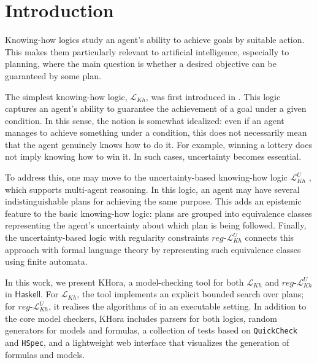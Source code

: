 \section{Introduction}

Knowing-how logics study an agent's ability to achieve goals by suitable action. This makes them particularly relevant to artificial intelligence, especially to planning, where the main question is whether a desired objective can be guaranteed by some plan.\par

The simplest knowing-how logic, $\mathcal{L}_{Kh}$, was first introduced in \cite{Wang2015}. This logic captures an agent's ability to guarantee the achievement of a goal under a given condition. In this sense, the notion is somewhat idealized: even if an agent manages to achieve something under a condition, this does not necessarily mean that the agent genuinely knows how to do it. For example, winning a lottery does not imply knowing how to win it. In such cases, uncertainty becomes essential.\par

To address this, one may move to the uncertainty-based knowing-how logic $\mathcal{L}^U_{Kh}$ \cite{Areces2021}, which supports multi-agent reasoning. In this logic, an agent may have several indistinguishable plans for achieving the same purpose. This adds an epistemic feature to the basic knowing-how logic: plans are grouped into equivalence classes representing the agent's uncertainty about which plan is being followed. Finally, the uncertainty-based logic with regularity constraints $reg\text{-}\mathcal{L}^U_{Kh}$ connects this approach with formal language theory by representing such equivalence classes using finite automata.\par

In this work, we present \textsf{KHora}, a model-checking tool for both $\mathcal{L}_{Kh}$ and $reg\text{-}\mathcal{L}^U_{Kh}$ in $\textsf{Haskell}$. For $\mathcal{L}_{Kh}$, the tool implements an explicit bounded search over plans; for $reg\text{-}\mathcal{L}^U_{Kh}$, it realises the algorithms of \cite{Demri2023} in an executable setting. In addition to the core model checkers, \textsf{KHora} includes parsers for both logics, random generators for models and formulas, a collection of tests based on \texttt{QuickCheck} and \texttt{HSpec}, and a lightweight web interface that visualizes the generation of formulas and models.